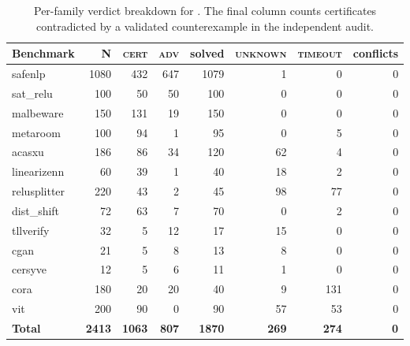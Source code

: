 \begin{table}[h]
\caption{Per-family verdict breakdown for \hz{}. The final column counts certificates contradicted
by a validated counterexample in the independent audit.}\label{tab:verdict}
\centering\footnotesize
\setlength{\tabcolsep}{4.5pt}\renewcommand{\arraystretch}{1.05}
\begin{tabular}{lrrrrrrr}
\toprule
\textbf{Benchmark} & \textbf{N} & \textbf{\textsc{cert}} & \textbf{\textsc{adv}} & \textbf{solved} & \textbf{\textsc{unknown}} & \textbf{\textsc{timeout}} & \textbf{conflicts}\\
\midrule
safenlp      & 1080 & 432 & 647 & 1079 & 1 & 0 & 0\\
sat\_relu    & 100 & 50 & 50 & 100 & 0 & 0 & 0\\
malbeware    & 150 & 131 & 19 & 150 & 0 & 0 & 0\\
metaroom     & 100 & 94 & 1 & 95 & 0 & 5 & 0\\
acasxu       & 186 & 86 & 34 & 120 & 62 & 4 & 0\\
linearizenn  & 60 & 39 & 1 & 40 & 18 & 2 & 0\\
relusplitter & 220 & 43 & 2 & 45 & 98 & 77 & 0\\
dist\_shift  & 72 & 63 & 7 & 70 & 0 & 2 & 0\\
tllverify    & 32 & 5 & 12 & 17 & 15 & 0 & 0\\
cgan         & 21 & 5 & 8 & 13 & 8 & 0 & 0\\
cersyve      & 12 & 5 & 6 & 11 & 1 & 0 & 0\\
cora         & 180 & 20 & 20 & 40 & 9 & 131 & 0\\
\textcolor{RevisionBlue}{vit} & \textcolor{RevisionBlue}{200} & \textcolor{RevisionBlue}{90} & \textcolor{RevisionBlue}{0} & \textcolor{RevisionBlue}{90} & \textcolor{RevisionBlue}{57} & \textcolor{RevisionBlue}{53} & \textcolor{RevisionBlue}{0}\\
\midrule
\textbf{Total} & \textcolor{RevisionBlue}{\textbf{2413}} & \textcolor{RevisionBlue}{\textbf{1063}} & \textcolor{RevisionBlue}{\textbf{807}} & \textcolor{RevisionBlue}{\textbf{1870}} & \textcolor{RevisionBlue}{\textbf{269}} & \textcolor{RevisionBlue}{\textbf{274}} & \textbf{0}\\
\bottomrule
\end{tabular}
\end{table}
